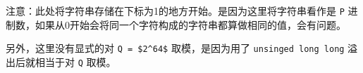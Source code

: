 \begin{information}
    注意：此处将字符串存储在下标为1的地方开始。是因为这里将字符串看作是 \lstinline{P} 进制数，如果从0开始会将同一个字符构成的字符串都算做相同的值，会有问题。

    另外，这里没有显式的对 \lstinline{Q = $2^64$} 取模，是因为用了 \lstinline{unsinged long long} 溢出后就相当于对 \lstinline{Q} 取模。
\end{information}


